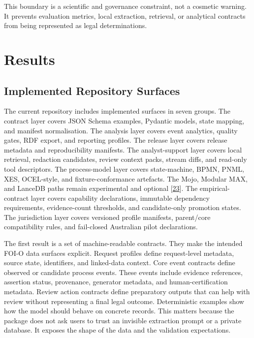 \documentclass[
]{article}
\begin{document}
This boundary is a scientific and governance constraint, not a cosmetic
warning. It prevents evaluation metrics, local extraction, retrieval, or
analytical contracts from being represented as legal determinations.

\section{Results}\label{results}

\subsection{Implemented Repository
Surfaces}\label{implemented-repository-surfaces}

The current repository includes implemented surfaces in seven groups.
The contract layer covers JSON Schema examples, Pydantic models, state
mapping, and manifest normalisation. The analysis layer covers event
analytics, quality gates, RDF export, and reporting profiles. The
release layer covers release metadata and reproducibility manifests. The
analyst-support layer covers local retrieval, redaction candidates,
review context packs, stream diffs, and read-only tool descriptors. The
process-model layer covers state-machine, BPMN, PNML, XES, OCEL-style,
and fixture-conformance artefacts. The Mojo, Modular MAX, and LanceDB
paths remain experimental and optional {[}\hyperlink{ref-23}{23}{]}. The empirical-contract
layer covers capability declarations, immutable dependency requirements,
evidence-count thresholds, and candidate-only promotion states. The
jurisdiction layer covers versioned profile manifests, parent/core
compatibility rules, and fail-closed Australian pilot declarations.

The first result is a set of machine-readable contracts. They make the
intended FOI-O data surfaces explicit. Request profiles define
request-level metadata, source state, identifiers, and linked-data
context. Core event contracts define observed or candidate process
events. These events include evidence references, assertion status,
provenance, generator metadata, and human-certification metadata. Review
action contracts define preparatory outputs that can help with review
without representing a final legal outcome. Deterministic examples show
how the model should behave on concrete records. This matters because
the package does not ask users to trust an invisible extraction prompt
or a private database. It exposes the shape of the data and the
validation expectations.
\end{document}
